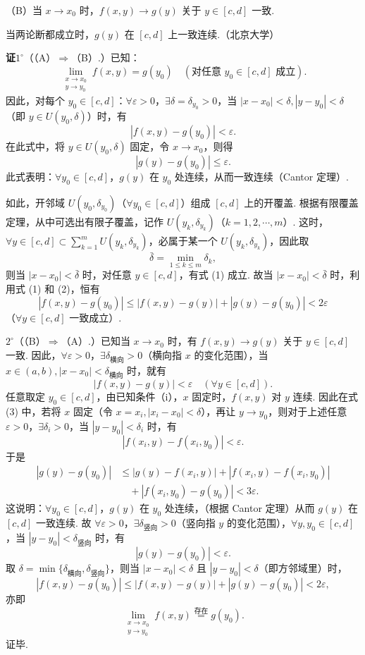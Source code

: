 \documentclass[UTF8, 12pt, fontset=fandol, oneside]{ctexart}
\begin{document}
（B）当 $x\to x_0$ 时，$f(x,y)\to g(y)$ 关于 $y\in[c,d]$ 一致.

当两论断都成立时，$g(y)$ 在 $[c,d]$ 上一致连续.（北京大学）

\noindent\textbf{证}\quad $1^\circ$（（A）$\Rightarrow$（B）.）已知：
\[
  \lim_{\substack{x\to x_0\\ y\to y_0}}f(x,y)=g(y_0)
  \quad(\text{对任意 }y_0\in[c,d]\text{ 成立}).
\]
因此，对每个 $y_0\in[c,d]$：$\forall\varepsilon>0$，$\exists\delta=\delta_{y_0}>0$，当 $|x-x_0|<\delta,|y-y_0|<\delta$（即 $y\in U(y_0,\delta)$）时，有
\[
  |f(x,y)-g(y_0)|<\varepsilon. \tag{1}
\]
在此式中，将 $y\in U(y_0,\delta)$ 固定，令 $x\to x_0$，则得
\[
  |g(y)-g(y_0)|\le\varepsilon. \tag{2}
\]
此式表明：$\forall y_0\in[c,d]$，$g(y)$ 在 $y_0$ 处连续，从而一致连续（Cantor 定理）.

如此，开邻域 $U(y_0,\delta_{y_0})$（$\forall y_0\in[c,d]$）组成 $[c,d]$ 上的开覆盖. 根据有限覆盖定理，从中可选出有限子覆盖，记作 $U(y_k,\delta_{y_k})$（$k=1,2,\cdots,m$）. 这时，$\forall y\in[c,d]\subset\displaystyle\sum_{k=1}^m U(y_k,\delta_{y_k})$，必属于某一个 $U(y_k,\delta_{y_k})$，因此取
\[
  \bar\delta=\min_{1\le k\le m}\delta_k,
\]
则当 $|x-x_0|<\bar\delta$ 时，对任意 $y\in[c,d]$，有式 (1) 成立. 故当 $|x-x_0|<\bar\delta$ 时，利用式 (1) 和 (2)，恒有
\[
  |f(x,y)-g(y_0)|\le |f(x,y)-g(y)|+|g(y)-g(y_0)|<2\varepsilon
\]
（$\forall y\in[c,d]$ 一致成立）.

$2^\circ$（（B）$\Rightarrow$（A）.）已知当 $x\to x_0$ 时，有 $f(x,y)\to g(y)$ 关于 $y\in[c,d]$ 一致. 因此，$\forall\varepsilon>0$，$\exists\delta_{\text{横向}}>0$（横向指 $x$ 的变化范围），当 $x\in(a,b),|x-x_0|<\delta_{\text{横向}}$ 时，就有
\[
  |f(x,y)-g(y)|<\varepsilon\quad(\forall y\in[c,d]). \tag{3}
\]
任意取定 $y_0\in[c,d]$，由已知条件（i），$x$ 固定时，$f(x,y)$ 对 $y$ 连续. 因此在式 (3) 中，若将 $x$ 固定（令 $x=x_i,|x_i-x_0|<\delta$），再让 $y\to y_0$，则对于上述任意 $\varepsilon>0$，$\exists\delta_i>0$，当 $|y-y_0|<\delta_i$ 时，有
\[
  |f(x_i,y)-f(x_i,y_0)|<\varepsilon.
\]
于是
\[
\begin{aligned}
|g(y)-g(y_0)|
&\le |g(y)-f(x_i,y)|+|f(x_i,y)-f(x_i,y_0)|\\
&\quad+|f(x_i,y_0)-g(y_0)|<3\varepsilon.
\end{aligned}
\]
这说明：$\forall y_0\in[c,d]$，$g(y)$ 在 $y_0$ 处连续，（根据 Cantor 定理）从而 $g(y)$ 在 $[c,d]$ 一致连续. 故 $\forall\varepsilon>0$，$\exists\delta_{\text{竖向}}>0$（竖向指 $y$ 的变化范围），$\forall y,y_0\in[c,d]$，当 $|y-y_0|<\delta_{\text{竖向}}$ 时，有
\[
  |g(y)-g(y_0)|<\varepsilon. \tag{4}
\]
取 $\delta=\min\{\delta_{\text{横向}},\delta_{\text{竖向}}\}$，则当 $|x-x_0|<\delta$ 且 $|y-y_0|<\delta$（即方邻域里）时，
\[
  |f(x,y)-g(y_0)|\le |f(x,y)-g(y)|+|g(y)-g(y_0)|<2\varepsilon,
\]
亦即
\[
  \lim_{\substack{x\to x_0\\ y\to y_0}}f(x,y)\stackrel{\text{存在}}{=}g(y_0).
\]
证毕.
\end{document}
